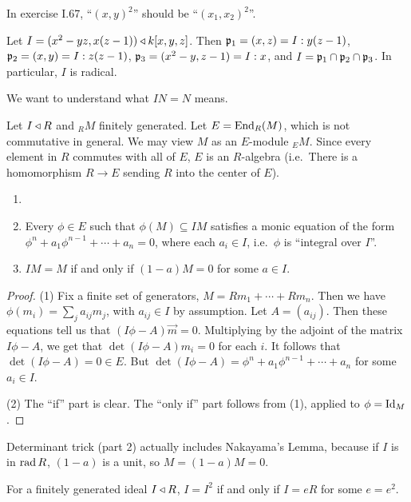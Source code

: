  \setcounter{lecture}{15}

 In exercise I.67, ``$(x,y)^2$'' should be ``$(x_1,x_2)^2$''.

 \begin{example}
   Let $I=(x^2-yz, x(z-1))\triangleleft k[x,y,z]$. Then $\mathfrak{p}_1=(x,z)=I:y(z-1)$, $\mathfrak{p}_2=(x,y)=I:z(z-1)$,
   $\mathfrak{p}_3=(x^2-y,z-1)=I:x$, and $I=\mathfrak{p}_1\cap\mathfrak{p}_2\cap\mathfrak{p}_3$. In particular, $I$ is radical.
 \end{example}

 We want to understand what $IN=N$ means.

 Let $I\triangleleft R$ and ${}_R M$ finitely generated. Let
 $E=\operatorname{End}_R (M)$, which is not commutative in general. We may view $M$ as an $E$-module
 ${}_E M$. Since every element in $R$ commutes with all of $E$, $E$ is an $R$-algebra (i.e.\
 There is a homomorphism $R\to E$ sending $R$ into the center of $E$).
 \begin{lemma}
  \begin{enumerate}\item[]
    \item Every $\phi\in E$ such that $\phi(M)\subseteq IM$ satisfies a monic equation
    of the form $\phi^n+a_1\phi^{n-1} +\cdots + a_n=0$, where each $a_i\in I$, i.e.\
    $\phi$ is ``integral over $I$''.

    \item $IM=M$ if and only if $(1-a)M=0$ for some $a\in I$.
  \end{enumerate}
 \end{lemma}
 \begin{proof}
   (1) Fix a finite set of generators, $M=Rm_1+\cdots + Rm_n$. Then we have
   $\phi(m_i)=\sum_j a_{ij} m_j$, with $a_{ij}\in I$ by assumption. Let $A=(a_{ij})$.
   Then these equations tell us that $(I\phi-A)\vec{m}=0$. Multiplying by the adjoint of
   the matrix $I\phi-A$, we get that $\det(I\phi-A)m_i=0$ for each $i$. It follows that
   $\det(I\phi-A)=0\in E$. But $\det(I\phi-A)=\phi^n+a_1\phi^{n-1}+\cdots +a_n$ for some
   $a_i\in I$.

   (2) The ``if'' part is clear. The ``only if'' part follows from (1), applied to
   $\phi=\mathrm{Id}_M$.
 \end{proof}
 \begin{remark}
   Determinant trick (part 2) actually includes Nakayama's Lemma, because if $I$ is in
   $\operatorname{rad} R$, $(1-a)$ is a unit, so $M=(1-a)M=0$.
 \end{remark}
 \begin{corollary}
   For a finitely generated ideal $I\triangleleft R$, $I=I^2$ if and only if $I=eR$ for some
   $e=e^2$.
 \end{corollary}
